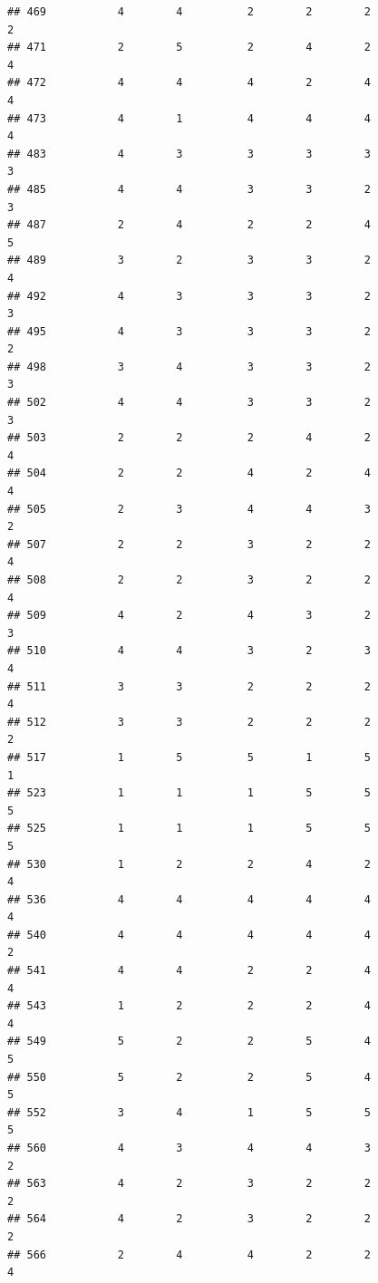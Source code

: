 \documentclass[
]{article}
\begin{document}
\begin{verbatim}
## 469           4        4          2        2        2               2
## 471           2        5          2        4        2               4
## 472           4        4          4        2        4               4
## 473           4        1          4        4        4               4
## 483           4        3          3        3        3               3
## 485           4        4          3        3        2               3
## 487           2        4          2        2        4               5
## 489           3        2          3        3        2               4
## 492           4        3          3        3        2               3
## 495           4        3          3        3        2               2
## 498           3        4          3        3        2               3
## 502           4        4          3        3        2               3
## 503           2        2          2        4        2               4
## 504           2        2          4        2        4               4
## 505           2        3          4        4        3               2
## 507           2        2          3        2        2               4
## 508           2        2          3        2        2               4
## 509           4        2          4        3        2               3
## 510           4        4          3        2        3               4
## 511           3        3          2        2        2               4
## 512           3        3          2        2        2               2
## 517           1        5          5        1        5               1
## 523           1        1          1        5        5               5
## 525           1        1          1        5        5               5
## 530           1        2          2        4        2               4
## 536           4        4          4        4        4               4
## 540           4        4          4        4        4               2
## 541           4        4          2        2        4               4
## 543           1        2          2        2        4               4
## 549           5        2          2        5        4               5
## 550           5        2          2        5        4               5
## 552           3        4          1        5        5               5
## 560           4        3          4        4        3               2
## 563           4        2          3        2        2               2
## 564           4        2          3        2        2               2
## 566           2        4          4        2        2               4

\end{verbatim}
\end{document}
